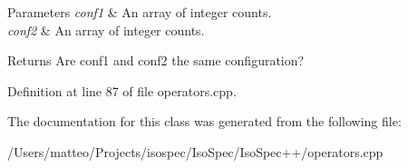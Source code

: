 \begin{DoxyParams}{Parameters}
{\em conf1} & An array of integer counts. \\
\hline
{\em conf2} & An array of integer counts. \\
\hline
\end{DoxyParams}
\begin{DoxyReturn}{Returns}
Are conf1 and conf2 the same configuration? 
\end{DoxyReturn}


Definition at line 87 of file operators.\+cpp.



The documentation for this class was generated from the following file\+:\begin{DoxyCompactItemize}
\item 
/\+Users/matteo/\+Projects/isospec/\+Iso\+Spec/\+Iso\+Spec++/operators.\+cpp\end{DoxyCompactItemize}
